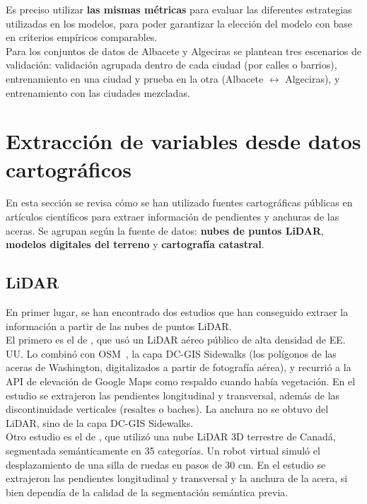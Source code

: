 Es preciso utilizar \textbf{las mismas métricas} para evaluar las diferentes estrategias utilizadas en los modelos, para poder garantizar la elección del modelo con base en criterios empíricos comparables.
\\

Para los conjuntos de datos de Albacete y Algeciras se plantean tres escenarios de validación: validación agrupada dentro de cada ciudad (por calles o barrios), entrenamiento en una ciudad y prueba en la otra (Albacete $\leftrightarrow$ Algeciras), y entrenamiento con las ciudades mezcladas.
\\

\section{Extracción de variables desde datos cartográficos}
\label{sec:datos-cartograficos}

En esta sección se revisa cómo se han utilizado fuentes cartográficas públicas en artículos científicos para extraer información de pendientes y anchuras de las aceras. Se agrupan según la fuente de datos: \textbf{nubes de puntos \gls{LiDAR}}, \textbf{modelos digitales del terreno} y \textbf{cartografía catastral}.
\\

\subsection{LiDAR}
En primer lugar, se han encontrado dos estudios que han conseguido extraer la información a partir de las nubes de puntos \gls{LiDAR}.
\\

El primero es el de \textcite{hossain2026}, que usó un \gls{LiDAR} aéreo público de alta densidad de EE. UU. Lo combinó con \gls{OSM}~\parencite{openstreetmap}, la capa DC-GIS Sidewalks (los polígonos de las aceras de Washington, digitalizados a partir de fotografía aérea), y recurrió a la API de elevación de Google Maps como respaldo cuando había vegetación. En el estudio se extrajeron las pendientes longitudinal y transversal, además de las discontinuidade verticales (resaltes o baches). La anchura no se obtuvo del \gls{LiDAR}, sino de la capa DC-GIS Sidewalks.
\\

Otro estudio es el de \textcite{ahmadi2026}, que utilizó una nube \gls{LiDAR} 3D terrestre de Canadá, segmentada semánticamente en 35 categorías. Un robot virtual simuló el desplazamiento de una silla de ruedas en pasos de 30 cm. En el estudio se extrajeron las pendientes longitudinal y transversal y la anchura de la acera, si bien dependía de la calidad de la segmentación semántica previa.
\\

